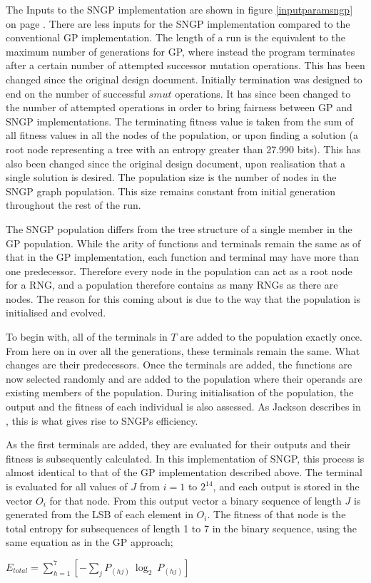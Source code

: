 \documentclass[a4paper,10.5pt]{article}
\begin{document}
The Inputs to the SNGP implementation are shown in figure \ref{inputparamsngp} on page \pageref{inputparamsngp}. There are less inputs for the SNGP implementation compared to the conventional GP implementation. The length of a run is the equivalent to the maximum number of generations for GP, where instead the program terminates after a certain number of attempted successor mutation operations. This has been changed since the original design document. Initially termination was designed to end on the number of successful $smut$ operations. It has since been changed to the number of attempted operations in order to bring fairness between GP and SNGP implementations. The terminating fitness value is taken from the sum of all fitness values in all the nodes of the population, or upon finding a solution (a root node representing a tree with an entropy greater than 27.990 bits). This has also been changed since the original design document, upon realisation that a single solution is desired. The population size is the number of nodes in the SNGP graph population. This size remains constant from initial generation throughout the rest of the run.

The SNGP population differs from the tree structure of a single member in the GP population. While the arity of functions and terminals remain the same as of that in the GP implementation, each function and terminal may have more than one predecessor. Therefore every node in the population can act as a root node for a RNG, and a population therefore contains as many RNGs as there are nodes. The reason for this coming about is due to the way that the population is initialised and evolved.

To begin with, all of the terminals in $T$ are added to the population exactly once. From here on in over all the generations, these terminals remain the same. What changes are their predecessors. Once the terminals are added, the functions are now selected randomly and are added to the population where their operands are existing members of the population. During initialisation of the population, the output and the fitness of each individual is also assessed. As Jackson describes in \cite[p.52]{jacksonsngp2}, this is what gives rise to SNGPs efficiency.

As the first terminals are added, they are evaluated for their outputs and their fitness is subsequently calculated. In this implementation of SNGP, this process is almost identical to that of the GP implementation described above. The terminal is evaluated for all values of $J$ from $i = 1$ to $2^{14}$, and each output is stored in the vector $O_i$ for that node. From this output vector a binary sequence of length $J$ is generated from the LSB of each element in $O_i$. The fitness of that node is the total entropy for subsequences of length 1 to 7 in the binary sequence, using the same equation as in the GP approach;
\begin{center}
 $E_{total} = \sum_{h = 1}^{7} \left[ - \sum_{j} P_{(hj)}\ \log_2\ P_{(hj)} \right]$
\end{center} 
\end{document}
